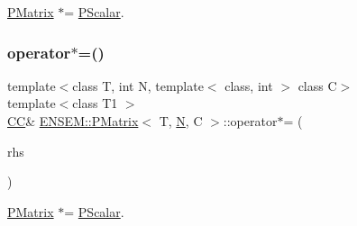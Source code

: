 \mbox{\hyperlink{classENSEM_1_1PMatrix}{P\+Matrix}} $\ast$= \mbox{\hyperlink{classENSEM_1_1PScalar}{P\+Scalar}}. 

\mbox{\label{classENSEM_1_1PMatrix_a4c25aeda146eb61d41abf6cf625a6153}} 
\subsubsection{\texorpdfstring{operator$\ast$=()}{operator*=()}\hspace{0.1cm}{\footnotesize\ttfamily [3/3]}}
{\footnotesize\ttfamily template$<$class T, int N, template$<$ class, int $>$ class C$>$ \\
template$<$class T1 $>$ \\
\mbox{\hyperlink{classENSEM_1_1PMatrix_a744bac549029029effe32dc1705660ec}{CC}}\& \mbox{\hyperlink{classENSEM_1_1PMatrix}{E\+N\+S\+E\+M\+::\+P\+Matrix}}$<$ T, \mbox{\hyperlink{adat__devel_2lib_2hadron_2operator__name__util_8cc_a7722c8ecbb62d99aee7ce68b1752f337}{N}}, C $>$\+::operator$\ast$= (\begin{DoxyParamCaption}\item[{const \mbox{\hyperlink{classENSEM_1_1PScalar}{P\+Scalar}}$<$ T1 $>$ \&}]{rhs }\end{DoxyParamCaption})\hspace{0.3cm}{\ttfamily [inline]}}



\mbox{\hyperlink{classENSEM_1_1PMatrix}{P\+Matrix}} $\ast$= \mbox{\hyperlink{classENSEM_1_1PScalar}{P\+Scalar}}. 

\mbox{\label{classENSEM_1_1PMatrix_af6bd651888f2621169845b757b2200ee}} 
